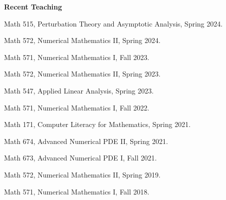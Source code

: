 \documentclass[11pt]{letter}
\begin{document}
	{\LARGE\bf  Recent Teaching}
    \begin{description}
    \item
Math 515, Perturbation Theory and Asymptotic Analysis, Spring 2024.
    \item
Math 572, Numerical Mathematics II, Spring 2024.
    \item
Math 571, Numerical Mathematics I, Fall 2023.
    \item
Math 572, Numerical Mathematics II, Spring 2023.
	\item
Math 547, Applied Linear Analysis, Spring 2023.
    \item
Math 571, Numerical Mathematics I, Fall 2022.
    \item
Math 171, Computer Literacy for Mathematics, Spring 2021.
    \item
Math 674, Advanced Numerical PDE II, Spring 2021.
    \item
Math 673, Advanced Numerical PDE I, Fall 2021.
    \item
Math 572, Numerical Mathematics II, Spring 2019.
    \item
Math 571, Numerical Mathematics I, Fall 2018.
	\end{description}
\end{document}
